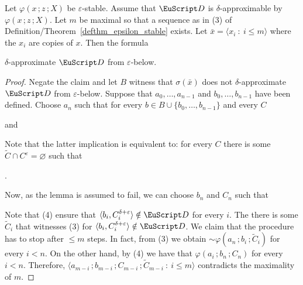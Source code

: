 \begin{lemma}
  Let $\varphi(x\,;z\,;X)$ be $\varepsilon$-stable.
  Assume that ${\EuScript D}$ is $\delta$-approximable by $\varphi(x\,;z\,;X)$.
  Let $m$ be maximal so that a sequence as in (3) of Definition/Theorem~\ref{defthm_epsilon_stable} exists.
  Let $\bar x=\langle x_i\ :\ i\le m\rangle$ where the $x_i$ are copies of $x$.
  Then the formula\smallskip

  \smallskip

  $\delta$-approximate ${\EuScript D}$ from $\varepsilon$-below.
\end{lemma}

\begin{proof}
  Negate the claim and let $B$ witness that $\sigma(\bar x)$ does not $\delta$-approximate ${\EuScript D}$ from $\varepsilon$-below.
  Suppose that $a_0,\dots,a_{n-1}$ and $b_0,\dots,b_{n-1}$ have been defined.
  Choose $a_n$ such that for every $b\in B\cup\{b_0,\dots,b_{n-1}\}$ and every $C$

  \quad and

  
  Note that the latter implication is equivalent to: for every $C$ there is some  $\tilde C\cap C^\varepsilon=\varnothing$ such that 
  
  .%

  Now, as the lemma is assumed to fail, we can choose $b_n$ and $C_n$ such that


  Note that (4) ensure that $\langle b_i,C_i^{\delta+\varepsilon}\rangle\notin{\EuScript D}$ for every $i$.
  The there is some $\tilde C_i$ that witnesses (3) for $\langle b_i,C_i^{\delta+\varepsilon}\rangle\notin{\EuScript D}$.
  We claim that the procedure has to stop after $\le m$ steps. 
  In fact, from (3) we obtain ${\sim}\varphi(a_n\,;b_i\,;\tilde C_i)$ for every $i<n$.
  On the other hand, by (4) we have that $\varphi(a_i\,;b_n\,;C_n)$ for every $i<n$.
  Therefore, $\langle a_{m-i}\,;b_{m-i}\,;C_{m-i}\,;\tilde C_{m-i}\ :\ i\le m\rangle$ contradicts the maximality of $m$.
\end{proof}
